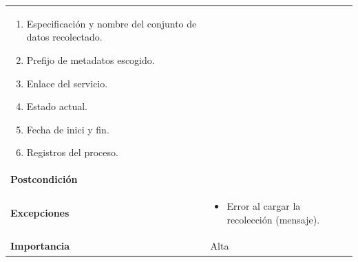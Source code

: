 \documentclass[
]{article}
\providecommand{\tightlist}{%
  \setlength{\itemsep}{0pt}\setlength{\parskip}{0pt}}
\begin{document}
\begin{longtable}[]{@{}ll@{}}
\begin{minipage}[t]{0.69\columnwidth}
\begin{enumerate}
  \begin{enumerate}
  \def\labelenumii{\alph{enumii}.}
  \tightlist
  \item
    Especificación y nombre del conjunto de datos recolectado.
  \item
    Prefijo de metadatos escogido.
  \item
    Enlace del servicio.
  \item
    Estado actual.
  \item
    Fecha de inici y fin.
  \item
    Registros del proceso.
  \end{enumerate}
\end{enumerate}\strut
\end{minipage}\tabularnewline
\begin{minipage}[t]{0.25\columnwidth}\raggedright
\textbf{Postcondición}\strut
\end{minipage} & \begin{minipage}[t]{0.69\columnwidth}\raggedright
\strut
\end{minipage}\tabularnewline
\begin{minipage}[t]{0.25\columnwidth}\raggedright
\textbf{Excepciones}\strut
\end{minipage} & \begin{minipage}[t]{0.69\columnwidth}\raggedright
\begin{itemize}
\tightlist
\item
  Error al cargar la recolección (mensaje).
\end{itemize}\strut
\end{minipage}\tabularnewline
\begin{minipage}[t]{0.25\columnwidth}\raggedright
\textbf{Importancia}\strut
\end{minipage} & \begin{minipage}[t]{0.69\columnwidth}\raggedright
Alta\strut
\end{minipage}\tabularnewline
\bottomrule
\end{longtable}
\end{document}
